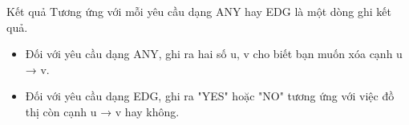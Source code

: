 Kết quả
Tương ứng với mỗi yêu cầu dạng ANY hay EDG là một dòng ghi kết quả.  
\begin{itemize}
	\item     Đối với yêu cầu dạng ANY, ghi ra hai số u, v cho biết bạn muốn xóa cạnh u → v.   
	\item     Đối với yêu cầu dạng EDG, ghi ra "YES" hoặc "NO" tương ứng với việc đồ thị còn cạnh u → v hay không.   
\end{itemize}